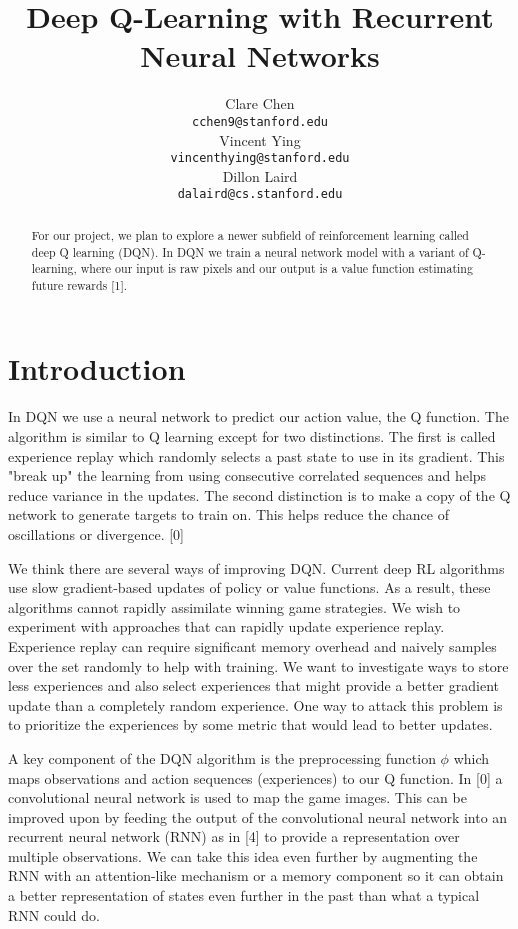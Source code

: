\documentclass{article}
\title{Deep Q-Learning with Recurrent Neural Networks}
\author{
  Clare Chen \\
  \texttt{cchen9@stanford.edu} \\
  \And
  Vincent Ying \\
  \texttt{vincenthying@stanford.edu} \\
  \And
  Dillon Laird \\
  \texttt{dalaird@cs.stanford.edu} \\
}
\begin{document}

\maketitle

\begin{abstract}
  For our project, we plan to explore a newer subfield of reinforcement learning called deep Q learning (DQN). In DQN we train a neural network model with a variant of Q-learning, where our input is raw pixels and our output is a value function estimating future rewards [1]. 
\end{abstract}

\section{Introduction}
	In DQN we use a neural network to predict our action value, the Q function. The algorithm is similar to Q learning except for two distinctions. The first is called experience replay which randomly selects a past state to use in its gradient. This "break up" the learning from using consecutive correlated sequences and helps reduce variance in the updates. The second distinction is to make a copy of the Q network to generate targets to train on. This helps reduce the chance of oscillations or divergence. [0]

	We think there are several ways of improving DQN. Current deep RL algorithms use slow gradient-based updates of policy or value functions.  As a result, these algorithms cannot rapidly assimilate winning game strategies.  We wish to experiment with approaches that can rapidly update experience replay. Experience replay can require significant memory overhead and naively samples over the set randomly to help with training. We want to investigate ways to store less experiences and also select experiences that might provide a better gradient update than a completely random experience. One way to attack this problem is to prioritize the experiences by some metric that would lead to better updates.

	A key component of the DQN algorithm is the preprocessing function $\phi$ which maps observations and action sequences (experiences) to our Q function. In [0] a convolutional neural network is used to map the game images. This can be improved upon by feeding the output of the convolutional neural network into an recurrent neural network (RNN) as in [4] to provide a representation over multiple observations. We can take this idea even further by augmenting the RNN with an attention-like mechanism or a memory component so it can obtain a better representation of states even further in the past than what a typical RNN could do. 
\end{document}

